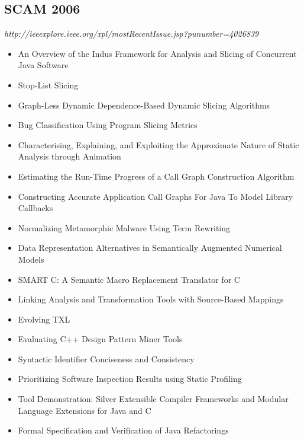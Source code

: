 \subsection{SCAM 2006}

{\small \em http://ieeexplore.ieee.org/xpl/mostRecentIssue.jsp?punumber=4026839}

{\small
\begin{itemize}[itemsep=-1ex]
  \item An Overview of the Indus Framework for Analysis and Slicing of Concurrent Java Software {\color{blue} \checkmark}{\color{blue} \checkmark}
  \item Stop-List Slicing
  \item Graph-Less Dynamic Dependence-Based Dynamic Slicing Algorithms
  \item Bug Classification Using Program Slicing Metrics {\color{blue} \checkmark}{\color{red} \texttimes}
  \item Characterising, Explaining, and Exploiting the Approximate Nature of Static Analysis through Animation
  \item Estimating the Run-Time Progress of a Call Graph Construction Algorithm {\color{blue} \checkmark}{\color{blue} \checkmark}
  \item Constructing Accurate Application Call Graphs For Java To Model Library Callbacks {\color{blue} \checkmark}{\color{red} \texttimes}
  \item Normalizing Metamorphic Malware Using Term Rewriting
  \item Data Representation Alternatives in Semantically Augmented Numerical Models
  \item SMART C: A Semantic Macro Replacement Translator for C
  \item Linking Analysis and Transformation Tools with Source-Based Mappings {\color{blue} \checkmark}{\color{red} \texttimes}
  \item Evolving TXL {\color{blue} \checkmark}{\color{red} \texttimes}
  \item Evaluating C++ Design Pattern Miner Tools
  \item Syntactic Identifier Conciseness and Consistency
  \item Prioritizing Software Inspection Results using Static Profiling {\color{blue} \checkmark}{\color{red} \texttimes}
  \item Tool Demonstration: Silver Extensible Compiler Frameworks and Modular Language Extensions for Java and C
  \item Formal Specification and Verification of Java Refactorings

\end{itemize}}
